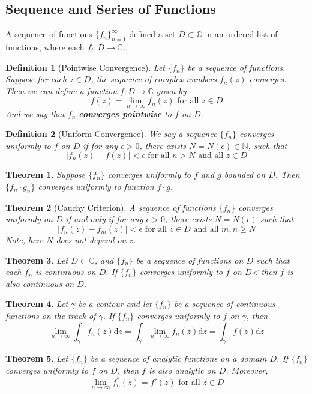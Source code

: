 \documentclass[12pt]{article}
\newcommand{\diff}{\mathrm{d}}
\newtheorem{definition}{Definition}[section]
\newtheorem{theorem}{Theorem}[section]
\theoremstyle{definition}
\begin{document}
\subsection{Sequence and Series of Functions}
A sequence of functions $\{f_n\}_{n=1}^\infty$ defined a set $D\subset \mathbb{C}$ in an ordered list of functions, where each $f_i:D\to \mathbb{C}$.
\begin{definition}[Pointwise Convergence]
\normalfont Let $\{f_n\}$ be a sequence of functions. Suppose for each $z\in D$, the sequence of complex numbers ${f_n(z)}$ converges. Then we can define a function $f:D\to\mathbb{C}$ given by
\[
f(z)=\lim_{n\to\infty}f_n(z)\text{ for all }z\in D
\]
And we say that ${f_n}$ \textbf{converges pointwise} to $f$ on $D$.
\end{definition}
\begin{definition}[Uniform Convergence]
\normalfont We say a sequence $\{f_n\}$ converges uniformly to $f$ on $D$ if for any $\epsilon>0$, there exists $N=N(\epsilon)\in \mathbb{N}$, such that
\[
|f_n(z)-f(z)|<\epsilon \text{ for all }n>N \text{ and all }z\in D
\]
\end{definition}
\begin{theorem}\normalfont Suppose $\{f_n\}$ converges uniformly to $f$ and $g$ bounded on $D$. Then $\{f_n\cdot g_n\}$ converges uniformly to function $f\cdot g$.
\end{theorem}
\begin{theorem}[Cauchy Criterion]
\normalfont A sequence of functions $\{f_n\}$ converges uniformly on $D$ if and only if for any $\epsilon>0$, there exists $N=N(\epsilon)$ such that
\[
|f_n(z)-f_m(z)|<\epsilon \text{ for all }z\in D\text{ and all }m,n\geq N
\]
Note, here $N$ does not depend on $z$.
\end{theorem}
\begin{theorem}
\normalfont Let $D\subset\mathbb{C}$, and $\{f_n\}$ be a sequence of functions on $D$ such that each $f_n$ is continuous on $D$. If $\{f_n\}$ converges uniformly to $f$ on $D$< then $f$ is also continuous on $D$.
\end{theorem}
\begin{theorem}\normalfont Let $\gamma$ be a contour and let $\{f_n\}$ be a sequence of continuous functions on the track of $\gamma$. If $\{f_n\}$ converges uniformly to $f$ on $\gamma$, then 
\[
\lim_{n\to\infty}\int_\gamma f_n(z)\diff z = \int_\gamma \lim_{n\to\infty}f_n(z)\diff z = \int_\gamma f(z)\diff z
\]
\end{theorem}
\begin{theorem}\normalfont Let $\{f_n\}$ be a sequence of analytic functions on a domain $D$. If $\{f_n\}$ converges uniformly to $f$ on $D$, then $f$ is also analytic on $D$. Moreover,
\[
\lim_{n\to\infty}f_n^\ast(z)=f'(z)\text{ for all }z\in D
\]
\end{theorem}
\end{document}
